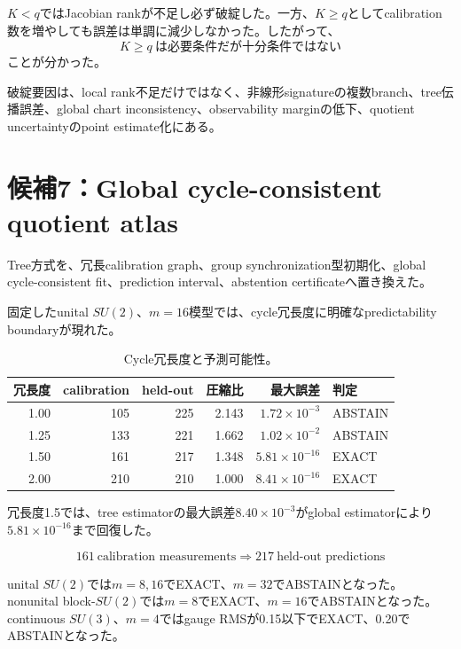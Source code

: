 \documentclass[11pt,a4paper,uplatex,dvipdfmx]{bxjsarticle}
\theoremstyle{remark}
\begin{document}
$K<q$ではJacobian rankが不足し必ず破綻した。一方、$K\ge q$としてcalibration数を増やしても誤差は単調に減少しなかった。したがって、
\begin{equation}
\boxed{K\ge q\ \text{は必要条件だが十分条件ではない}}
\end{equation}
ことが分かった。

破綻要因は、local rank不足だけではなく、非線形signatureの複数branch、tree伝播誤差、global chart inconsistency、observability marginの低下、quotient uncertaintyのpoint estimate化にある。

\section{候補7：Global cycle-consistent quotient atlas}

Tree方式を、冗長calibration graph、group synchronization型初期化、global cycle-consistent fit、prediction interval、abstention certificateへ置き換えた。

固定したunital $SU(2)$、$m=16$模型では、cycle冗長度に明確なpredictability boundaryが現れた。

\begin{table}[htbp]
\centering
\caption{Cycle冗長度と予測可能性。}
\label{tab:cycle-threshold}
\begin{tabular}{rrrrrl}
\toprule
冗長度 & calibration & held-out & 圧縮比 & 最大誤差 & 判定 \\
\midrule
1.00 & 105 & 225 & 2.143 & $1.72\times10^{-3}$ & ABSTAIN \\
1.25 & 133 & 221 & 1.662 & $1.02\times10^{-2}$ & ABSTAIN \\
1.50 & 161 & 217 & 1.348 & $5.81\times10^{-16}$ & EXACT \\
2.00 & 210 & 210 & 1.000 & $8.41\times10^{-16}$ & EXACT \\
\bottomrule
\end{tabular}
\end{table}

冗長度1.5では、tree estimatorの最大誤差$8.40\times10^{-3}$がglobal estimatorにより$5.81\times10^{-16}$まで回復した。

\begin{equation}
\boxed{
161\ \text{calibration measurements}
\Longrightarrow
217\ \text{held-out predictions}
}
\end{equation}

unital $SU(2)$では$m=8,16$でEXACT、$m=32$でABSTAINとなった。nonunital block-$SU(2)$では$m=8$でEXACT、$m=16$でABSTAINとなった。continuous $SU(3)$、$m=4$ではgauge RMSが0.15以下でEXACT、0.20でABSTAINとなった。
\end{document}
